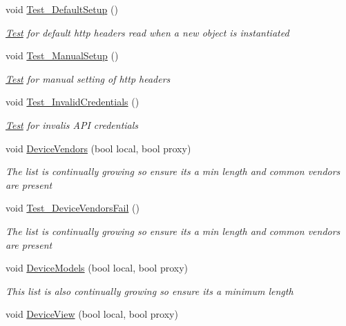 \begin{DoxyCompactItemize}
void \hyperlink{class_h_d3_1_1_test_1_1_h_d3_test_ae0d5998f007f3d055bea00589a744668}{Test\+\_\+\+Default\+Setup} ()
\begin{DoxyCompactList}\small\item\em \hyperlink{namespace_h_d3_1_1_test}{Test} for default http headers read when a new object is instantiated \end{DoxyCompactList}\item 
void \hyperlink{class_h_d3_1_1_test_1_1_h_d3_test_a586e6f5874d7946b5294fb6ff3fa4acd}{Test\+\_\+\+Manual\+Setup} ()
\begin{DoxyCompactList}\small\item\em \hyperlink{namespace_h_d3_1_1_test}{Test} for manual setting of http headers \end{DoxyCompactList}\item 
void \hyperlink{class_h_d3_1_1_test_1_1_h_d3_test_a7f6749b2ad203c4cc782af151787d70a}{Test\+\_\+\+Invalid\+Credentials} ()
\begin{DoxyCompactList}\small\item\em \hyperlink{namespace_h_d3_1_1_test}{Test} for invalis A\+P\+I credentials \end{DoxyCompactList}\item 
void \hyperlink{class_h_d3_1_1_test_1_1_h_d3_test_a8c45dad93eac37046ff73898012d94e0}{Device\+Vendors} (bool local, bool proxy)
\begin{DoxyCompactList}\small\item\em The list is continually growing so ensure its a min length and common vendors are present \end{DoxyCompactList}\item 
void \hyperlink{class_h_d3_1_1_test_1_1_h_d3_test_a358f5267e8cf30c24931cbf3692af1ae}{Test\+\_\+\+Device\+Vendors\+Fail} ()
\begin{DoxyCompactList}\small\item\em The list is continually growing so ensure its a min length and common vendors are present \end{DoxyCompactList}\item 
void \hyperlink{class_h_d3_1_1_test_1_1_h_d3_test_a2adb09017cb44d368c271f12af27e3e2}{Device\+Models} (bool local, bool proxy)
\begin{DoxyCompactList}\small\item\em This list is also continually growing so ensure its a minimum length \end{DoxyCompactList}\item 
void \hyperlink{class_h_d3_1_1_test_1_1_h_d3_test_a495b9e3d48918da6aeb416b5d4291f7a}{Device\+View} (bool local, bool proxy)

\end{DoxyCompactItemize}
